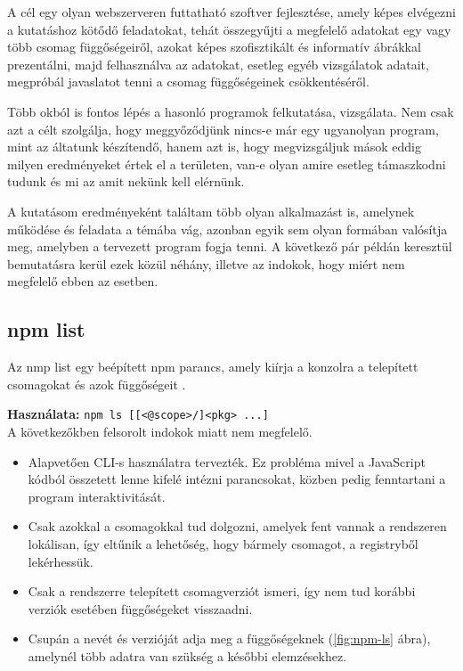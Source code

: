 	A cél egy olyan webszerveren futtatható szoftver fejlesztése, amely képes elvégezni a kutatáshoz kötődő feladatokat, tehát összegyűjti a megfelelő adatokat egy vagy több csomag függőségeiről, azokat képes szofisztikált és informatív ábrákkal prezentálni, majd felhasználva az adatokat, esetleg egyéb vizsgálatok adatait, megpróbál javaslatot tenni a csomag függőségeinek csökkentéséről.
	
	\pagebreak


Több okból is fontos lépés a hasonló programok felkutatása, vizsgálata. Nem csak azt a célt szolgálja, hogy meggyőződjünk nincs-e már egy ugyanolyan program, mint az áltatunk készítendő, hanem azt is, hogy megvizsgáljuk mások eddig milyen eredményeket értek el a területen, van-e olyan amire esetleg támaszkodni tudunk és mi az amit nekünk kell elérnünk.

A kutatásom eredményeként találtam több olyan alkalmazást is, amelynek működése és feladata a témába vág, azonban egyik sem olyan formában valósítja meg, amelyben a tervezett program fogja tenni. A következő pár példán keresztül bemutatásra kerül ezek közül néhány, illetve az indokok, hogy miért nem megfelelő ebben az esetben.

	\subsection{npm list}
	
	Az nmp list egy beépített npm parancs, amely kiírja a konzolra a telepített csomagokat és azok függőségeit \cite{dep-cruise}.
	
	\textbf{Használata:} \texttt{npm ls [[<@scope>/]<pkg> ...]}\\
	
	A következőkben felsorolt indokok miatt nem megfelelő.
	\begin{itemize}
		\item Alapvetően CLI-s használatra tervezték. Ez probléma mivel a JavaScript kódból összetett lenne kifelé intézni parancsokat, közben pedig fenntartani a program interaktivitását.
		\item Csak azokkal a csomagokkal tud dolgozni, amelyek fent vannak a rendszeren lokálisan, így eltűnik a lehetőség, hogy bármely csomagot, a registryből lekérhessük.
		\item Csak a rendszerre telepített csomagverziót ismeri, így nem tud korábbi verziók esetében függőségeket visszaadni.
		\item Csupán a nevét és verzióját adja meg a függőségeknek (\ref{fig:npm-ls} ábra), amelynél több adatra van szükség a későbbi elemzésekhez.
	\end{itemize}
		
